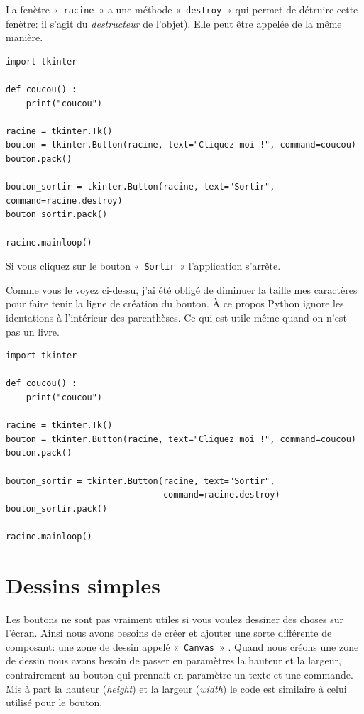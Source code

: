 La fenètre «~\texttt{racine}~» a une méthode «~\texttt{destroy}~» qui permet de détruire cette fenètre: il s'agit du \emph{destructeur} de l'objet). Elle peut être appelée de la même manière.

\begin{small}
\begin{Verbatim}[frame=single,rulecolor=\color{mbleu}, label=à taper]
import tkinter

def coucou() :
    print("coucou")

racine = tkinter.Tk()
bouton = tkinter.Button(racine, text="Cliquez moi !", command=coucou)
bouton.pack()

bouton_sortir = tkinter.Button(racine, text="Sortir", command=racine.destroy)
bouton_sortir.pack()

racine.mainloop()
\end{Verbatim}
\end{small}

Si vous cliquez sur le bouton «~\texttt{Sortir}~» l'application s'arrète.

Comme vous le voyez ci-dessu, j'ai été obligé de diminuer la taille mes caractères pour faire tenir la ligne de création du bouton. À ce propos Python ignore les identations à l'intérieur des parenthèses. Ce qui est utile même quand on n'est pas un livre. 

\begin{Verbatim}[frame=single,rulecolor=\color{gray}, label=ne pas saisir]
import tkinter

def coucou() :
    print("coucou")

racine = tkinter.Tk()
bouton = tkinter.Button(racine, text="Cliquez moi !", command=coucou)
bouton.pack()

bouton_sortir = tkinter.Button(racine, text="Sortir",
                               command=racine.destroy)
bouton_sortir.pack()

racine.mainloop()
\end{Verbatim}
 

\section{Dessins simples}

Les boutons ne sont pas vraiment utiles si vous voulez dessiner des choses sur l'écran. Ainsi nous avons besoins de créer et ajouter une sorte différente de composant: une zone de dessin appelé «~\texttt{Canvas}~» . Quand nous créons une zone de dessin nous avons besoin de passer en paramètres la hauteur et la largeur, contrairement au bouton qui prennait en paramètre un texte et une commande. Mis à part la hauteur (\emph{height}) et la largeur (\emph{width}) le code est similaire à celui utilisé pour le bouton.

